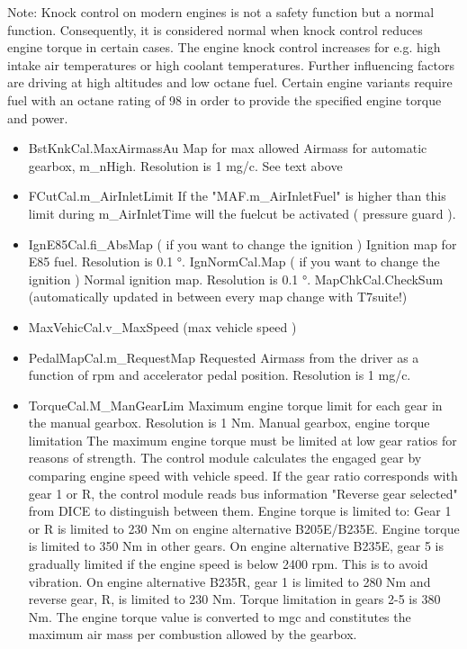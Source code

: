 \documentclass[11pt,a4paper]{book}
\begin{document}
Note: Knock control on modern engines is not a safety function but a normal
function. Consequently, it is considered normal when knock control reduces
engine torque in certain cases. The engine knock control increases for e.g. high
intake air temperatures or high coolant temperatures. Further influencing
factors are driving at high altitudes and low octane fuel. Certain engine
variants require fuel with an octane rating of \SI{98}{\RON} in order to provide the
specified engine torque and power.
\begin{itemize}
    \item
BstKnkCal.MaxAirmassAu
Map for max allowed Airmass for automatic gearbox, m\_nHigh. Resolution is 1 mg/c.
See text above
    \item
FCutCal.m\_AirInletLimit
If the "MAF.m\_AirInletFuel" is higher than this limit during m\_AirInletTime will the fuelcut be activated
( pressure guard ).
    \item
IgnE85Cal.fi\_AbsMap ( if you want to change the ignition )
Ignition map for E85 fuel. Resolution is 0.1 °.
IgnNormCal.Map ( if you want to change the ignition )
Normal ignition map. Resolution is 0.1 °.
MapChkCal.CheckSum (automatically updated in between every map change with T7suite!)
    \item
MaxVehicCal.v\_MaxSpeed (max vehicle speed )
    \item
PedalMapCal.m\_RequestMap
Requested Airmass from the driver as a function of rpm and accelerator pedal position. Resolution is 1
mg/c.
    \item
TorqueCal.M\_ManGearLim
Maximum engine torque limit for each gear in the manual gearbox. Resolution is 1 Nm.
Manual gearbox, engine torque limitation
The maximum engine torque must be limited at low gear ratios for reasons of strength.
The control module calculates the engaged gear by comparing engine speed with vehicle speed.
If the gear ratio corresponds with gear 1 or R, the control module reads bus information "Reverse
gear selected" from DICE to distinguish between them.
Engine torque is limited to:
Gear 1 or R is limited to 230 Nm on engine alternative B205E/B235E. Engine torque is limited to 350
Nm in other gears.
On engine alternative B235E, gear 5 is gradually limited if the engine speed is below 2400 rpm. This is
to avoid vibration.
On engine alternative B235R, gear 1 is limited to 280 Nm and reverse gear, R, is limited to 230 Nm.
Torque limitation in gears 2-5 is 380 Nm.
The engine torque value is converted to \si{mgc} and constitutes the maximum air
mass per combustion allowed by the gearbox.

\end{itemize}
\end{document}
